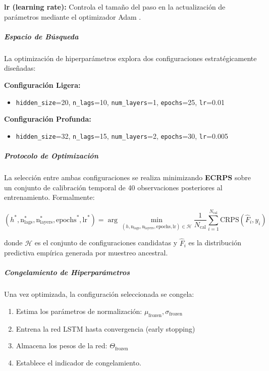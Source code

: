 \textbf{lr (learning rate):} Controla el tamaño del paso en la actualización de parámetros mediante el optimizador Adam \parencite{Kingma2015}.

\subparagraph{Espacio de Búsqueda}

La optimización de hiperparámetros explora dos configuraciones estratégicamente diseñadas:

\textbf{Configuración Ligera:}
\begin{itemize}
    \item \texttt{hidden\_size}=20, \texttt{n\_lags}=10, \texttt{num\_layers}=1, \texttt{epochs}=25, \texttt{lr}=0.01
\end{itemize}

\textbf{Configuración Profunda:}
\begin{itemize}
    \item \texttt{hidden\_size}=32, \texttt{n\_lags}=15, \texttt{num\_layers}=2, \texttt{epochs}=30, \texttt{lr}=0.005
\end{itemize}

\subparagraph{Protocolo de Optimización}

La selección entre ambas configuraciones se realiza minimizando \textbf{ECRPS} sobre un conjunto de calibración temporal de 40 observaciones posteriores al entrenamiento. Formalmente:

\begin{equation}
(h^*, \text{n}_\text{lags}^*, \text{n}_\text{layers}^*, \text{epochs}^*, \text{lr}^*) = \arg\min_{(h, \text{n}_\text{lags}, \text{n}_\text{layers}, \text{epochs}, \text{lr}) \in \mathcal{H}} \frac{1}{N_{\text{cal}}} \sum_{i=1}^{N_{\text{cal}}} \text{CRPS}(\hat{F}_i, y_i)
\end{equation}

donde $\mathcal{H}$ es el conjunto de configuraciones candidatas y $\hat{F}_i$ es la distribución predictiva empírica generada por muestreo ancestral.

\subparagraph{Congelamiento de Hiperparámetros}

Una vez optimizada, la configuración seleccionada se congela:

\begin{enumerate}
    \item Estima los parámetros de normalización: $\mu_{\text{frozen}}, \sigma_{\text{frozen}}$
    \item Entrena la red LSTM hasta convergencia (early stopping)
    \item Almacena los pesos de la red: $\Theta_{\text{frozen}}$
    \item Establece el indicador de congelamiento.
\end{enumerate}

